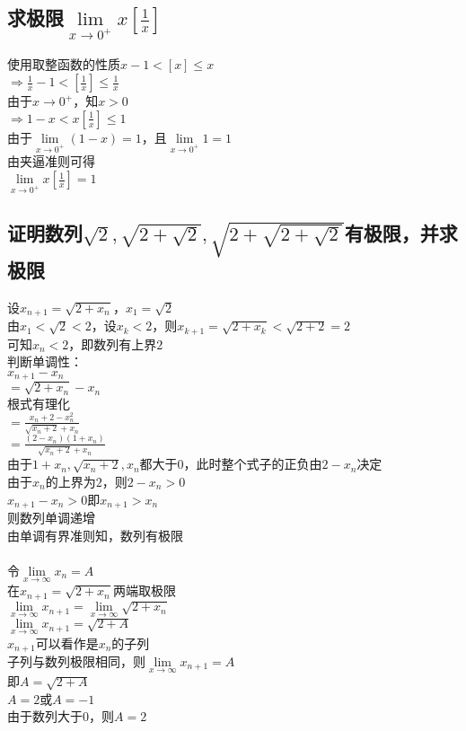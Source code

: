 \documentclass{article}
\begin{document}
\begin{flushleft}
\subsection{
	求极限$\lim\limits_{x\to 0^+}x[\frac{1}{x}]$
}
使用取整函数的性质$x-1<[x]\le x$\\
$\Rightarrow \frac{1}{x}-1<[\frac{1}{x}]\le \frac{1}{x}$\\
由于$x\to 0^+$，知$x>0$\\
$\Rightarrow 1-x<x[\frac{1}{x}]\le 1$\\
由于$\lim\limits_{x\to 0^+}(1-x)=1$，且$\lim\limits_{x\to 0^+}1=1$\\
由夹逼准则可得\\
$\lim\limits_{x\to 0^+}x[\frac{1}{x}]=1$\\

\subsection{
证明数列$\sqrt{2}, \sqrt{2+\sqrt{2}}, \sqrt{2+\sqrt{2+\sqrt{2}}}$有极限，并求极限
}
设$x_{n+1}=\sqrt{2+x_n}$，$x_1=\sqrt{2}$\\
由$x_1<\sqrt{2}<2$，设$x_k<2$，则$x_{k+1}=\sqrt{2+x_k}<\sqrt{2+2}=2$\\
可知$x_n<2$，即数列有上界$2$\\
判断单调性：\\
$x_{n+1}-x_n$\\
$=\sqrt{2+x_n}-x_n$\\
根式有理化\\
$=\frac{x_n+2-x_n^2}{\sqrt{x_n+2}+x_n}$\\
$=\frac{(2-x_n)(1+x_n)}{\sqrt{x_n+2}+x_n}$\\
由于$1+x_n, \sqrt{x_n+2}, x_n$都大于0，此时整个式子的正负由$2-x_n$决定\\
由于$x_n$的上界为$2$，则$2-x_n>0$\\
$x_{n+1}-x_n>0$即$x_{n+1}>x_n$\\
则数列单调递增\\
由单调有界准则知，数列有极限\\
~\\
令$\lim\limits_{x\to\infty}x_n=A$\\
在$x_{n+1}=\sqrt{2+x_n}$两端取极限\\
$\lim\limits_{x\to\infty}x_{n+1}=\lim\limits_{x\to\infty}\sqrt{2+x_n}$\\
$\lim\limits_{x\to\infty}x_{n+1}=\sqrt{2+A}$\\
$x_{n+1}$可以看作是$x_n$的子列\\
子列与数列极限相同，则$\lim\limits_{x\to\infty}x_{n+1}=A$\\
即$A=\sqrt{2+A}$\\
$A=2$或$A=-1$\\
由于数列大于0，则$A=2$\\




\end{flushleft}
\end{document}

